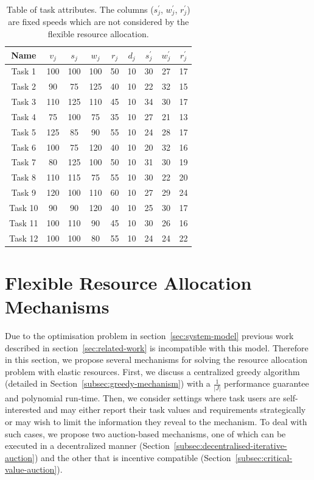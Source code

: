 \begin{table}[h]
    \begin{tabular}{|c||c|c|c|c|c||c|c|c|} 
        \hline
        Name & $v_j$ & $s_j$ & $w_j$ & $r_j$ & $d_j$ &  $s^{'}_j$ & $w^{'}_j$ & $r^{'}_j$ \\ [0.5ex] \hline\hline
        Task 1 & 100 & 100 & 100 & 50 & 10 & 30 & 27 & 17 \\ \hline
        Task 2 & 90 & 75 & 125 & 40 & 10 & 22 & 32 & 15 \\ \hline
        Task 3 & 110 & 125 & 110 & 45 & 10 & 34 & 30 & 17 \\ \hline
        Task 4 & 75 & 100 & 75 & 35 & 10 & 27 & 21 & 13 \\ \hline
        Task 5 & 125 & 85 & 90 & 55 & 10 & 24 & 28 & 17 \\ \hline
        Task 6 & 100 & 75 & 120 & 40 & 10 & 20 & 32 & 16 \\ \hline
        Task 7 & 80 & 125 & 100 & 50 & 10 & 31 & 30 & 19 \\ \hline
        Task 8 & 110 & 115 & 75 & 55 & 10 & 30 & 22 & 20 \\ \hline
        Task 9 & 120 & 100 & 110 & 60 & 10 & 27 & 29 & 24 \\ \hline
        Task 10 & 90 & 90 & 120 & 40 & 10 & 25 & 30 & 17 \\ \hline
        Task 11 & 100 & 110 & 90 & 45 & 10 & 30 & 26 & 16 \\ \hline
        Task 12 & 100 & 100 & 80 & 55 & 10 & 24 & 24 & 22 \\ \hline
   \end{tabular}
   \caption{Table of task attributes. The columns ($s^{'}_j$, $w^{'}_j$, $r^{'}_j$) are fixed speeds which are not
   considered by the flexible resource allocation.}
   \label{table:example_tasks_properties}
\end{table}

\section{Flexible Resource Allocation Mechanisms}\label{sec:flexible-resource-allocation-mechanisms}
Due to the optimisation problem in section~\ref{sec:system-model} previous work described in
section~\ref{sec:related-work} is incompatible with this model. Therefore in this section, we propose several
mechanisms for solving the resource allocation problem with elastic resources. First, we discuss a centralized greedy
algorithm (detailed in Section~\ref{subsec:greedy-mechanism}) with a $\frac{1}{\left|J\right|}$ performance guarantee
and polynomial run-time. Then, we consider settings where task users are self-interested and may either report their
task values and requirements strategically or may wish to limit the information they reveal to the mechanism. To deal
with such cases, we propose two auction-based  mechanisms, one of which can be executed in a decentralized manner
(Section~\ref{subsec:decentralised-iterative-auction}) and the other that is incentive compatible
(Section~\ref{subsec:critical-value-auction}).

